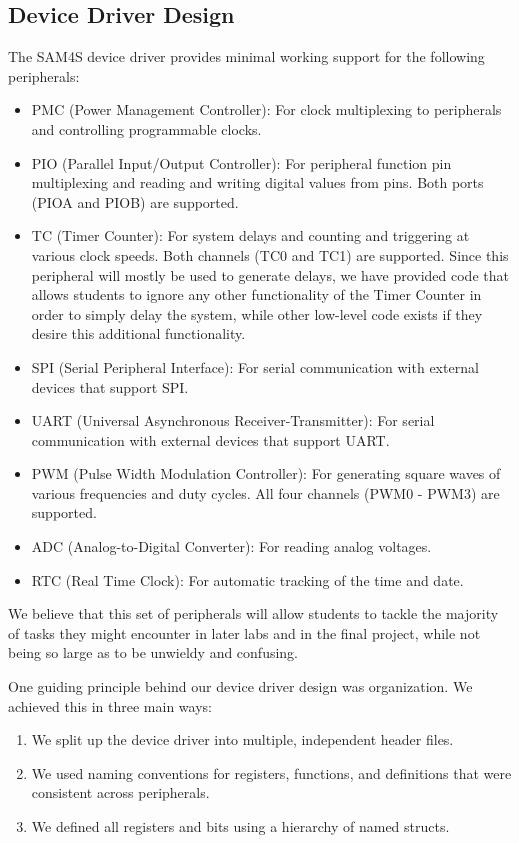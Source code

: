 \documentclass[12pt]{article}
\begin{document}
\subsection{Device Driver Design}
    The SAM4S device driver provides minimal working support for the following peripherals:
    \begin{itemize}
        \item PMC (Power Management Controller): For clock multiplexing to peripherals and controlling programmable clocks.
        \item PIO (Parallel Input/Output Controller): For peripheral function pin multiplexing and reading and writing digital values from pins. Both ports (PIOA and PIOB) are supported.
        \item TC (Timer Counter): For system delays and counting and triggering at various clock speeds. Both channels (TC0 and TC1) are supported. Since this peripheral will mostly be used to generate delays, we have provided code that allows students to ignore any other functionality of the Timer Counter in order to simply delay the system, while other low-level code exists if they desire this additional functionality.
        \item SPI (Serial Peripheral Interface): For serial communication with external devices that support SPI.
        \item UART (Universal Asynchronous Receiver-Transmitter): For serial communication with external devices that support UART.
        \item PWM (Pulse Width Modulation Controller): For generating square waves of various frequencies and duty cycles. All four channels (PWM0 - PWM3) are supported.
        \item ADC (Analog-to-Digital Converter): For reading analog voltages.
        \item RTC (Real Time Clock): For automatic tracking of the time and date.
    \end{itemize}
 
    We believe that this set of peripherals will allow students to tackle the majority of tasks they might encounter in later labs and in the final project, while not being so large as to be unwieldy and confusing.
    
    One guiding principle behind our device driver design was organization. We achieved this in three main ways: 
    \begin{enumerate}
        \item We split up the device driver into multiple, independent header files.
        \item We used naming conventions for registers, functions, and definitions that were consistent across peripherals.
        \item We defined all registers and bits using a hierarchy of named structs.
    \end{enumerate}
    
\end{document}
